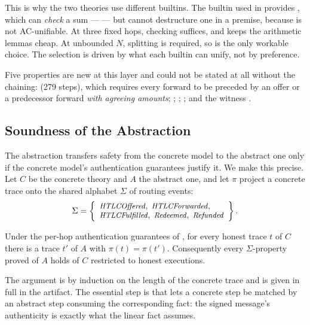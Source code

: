 This is why the two theories use different builtins. The
 builtin used in  provides
\code{\%+}, which can \emph{check} a sum --- 
--- but cannot destructure one in a premise, because \code{\%+} is not
AC-unifiable. At three fixed hops, checking suffices, and
 keeps the arithmetic lemmas cheap. At unbounded $N$,
splitting is required, so  is the only workable choice. The
selection is driven by what each builtin can unify, not by preference.

Five properties are new at this layer and could not be stated at all without
the chaining:  (279 steps), which requires
every forward to be preceded by an offer or a predecessor forward \emph{with
agreeing amounts}; ;
;
; and the witness
.

\subsection{Soundness of the Abstraction}
\label{sec:refinement}

The abstraction transfers safety from the concrete model to the abstract one
only if the concrete model's authentication guarantees justify it. We make this
precise. Let $C$ be the concrete theory and $A$ the abstract one, and let $\pi$
project a concrete trace onto the shared alphabet $\Sigma$ of routing events:
\[
\small
\Sigma = \left\{
\begin{array}{l}
\mathit{HTLCOffered},\ \mathit{HTLCForwarded},\\
\mathit{HTLCFulfilled},\ \mathit{Redeemed},\ \mathit{Refunded}
\end{array}
\right\}.
\]

\begin{thrm}[Refinement]
\label{thm:refinement}
Under the per-hop authentication guarantees of , for every
honest trace $t$ of $C$ there is a trace $t'$ of $A$ with $\pi(t) = \pi(t')$.
Consequently every $\Sigma$-property proved of $A$ holds of $C$ restricted to
honest executions.
\end{thrm}

The argument is by induction on the length of the concrete trace and is given
in full in the artifact. The essential step is that  lets a
concrete  step be matched by an abstract
 step consuming the corresponding  fact: the
signed message's authenticity is exactly what the linear fact assumes.

